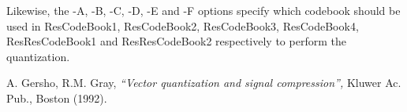 Likewise, the -A, -B, -C, -D, -E and -F options specify which codebook 
should be used in ResCodeBook1, ResCodeBook2, ResCodeBook3, ResCodeBook4, 
ResResCodeBook1 and ResResCodeBook2 respectively 
to perform the quantization. 


\begin{thebibliography}{999999}

 A. Gersho, R.M. Gray, {\em ``Vector quantization 
and signal compression'', } Kluwer Ac. Pub., Boston (1992). 

\end{thebibliography}
